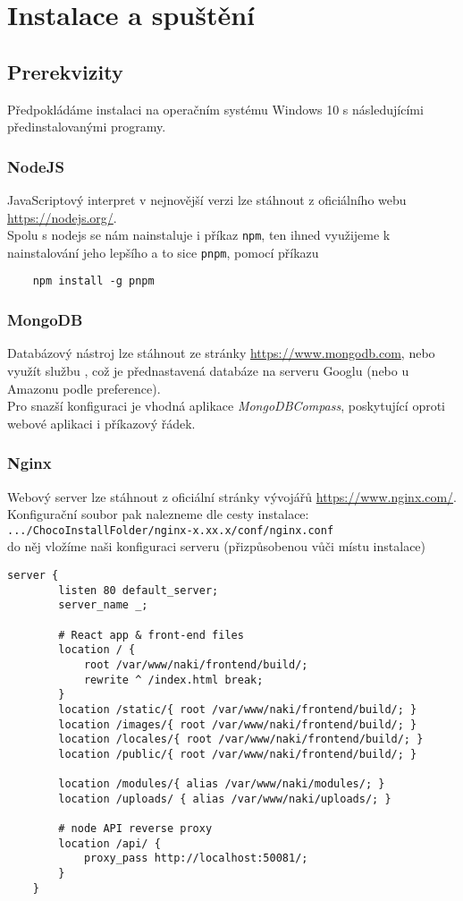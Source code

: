 \chapter{Instalace a spuštění}

\section{Prerekvizity}
Předpokládáme instalaci na operačním systému Windows 10 s následujícími 
předinstalovanými programy.
\subsection{NodeJS}
JavaScriptový interpret v nejnovější verzi lze stáhnout z oficiálního
webu \url{https://nodejs.org/}.\\
Spolu s nodejs se nám nainstaluje i příkaz \texttt{npm}, ten ihned využijeme
k nainstalování jeho lepšího  a to sice \texttt{pnpm}, pomocí
příkazu
\begin{lstlisting}
	npm install -g pnpm
\end{lstlisting}

\subsection{MongoDB}
Databázový nástroj lze stáhnout ze stránky \url{https://www.mongodb.com},
nebo využít službu , což je přednastavená databáze
na serveru Googlu (nebo u Amazonu podle preference).\\
Pro snazší konfiguraci je vhodná aplikace \textit{MongoDBCompass},
poskytující oproti webové aplikaci i příkazový řádek.

\subsection{Nginx}
Webový server lze stáhnout z oficiální stránky vývojářů \url{https://www.nginx.com/}.
Konfigurační soubor pak nalezneme dle cesty instalace:\\
\texttt{.../ChocoInstallFolder/nginx-x.xx.x/conf/nginx.conf}\\
do něj vložíme naši konfiguraci serveru (přizpůsobenou vůči místu instalace)
\begin{lstlisting}[keywordstyle=\ttfamily]
	server {
		listen 80 default_server;
		server_name _;

		# React app & front-end files
		location / {
			root /var/www/naki/frontend/build/;
			rewrite ^ /index.html break;
		}
		location /static/{ root /var/www/naki/frontend/build/; }
		location /images/{ root /var/www/naki/frontend/build/; }
		location /locales/{ root /var/www/naki/frontend/build/; }
		location /public/{ root /var/www/naki/frontend/build/; }

		location /modules/{ alias /var/www/naki/modules/; }
		location /uploads/ { alias /var/www/naki/uploads/; }

		# node API reverse proxy
		location /api/ {
			proxy_pass http://localhost:50081/;
		}
	}
\end{lstlisting}


